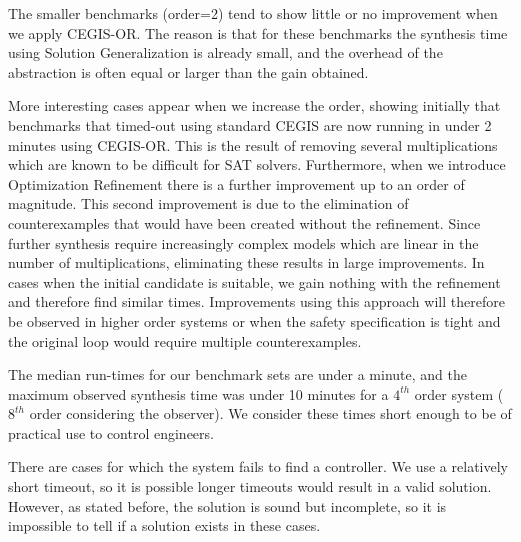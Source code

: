 \documentclass[sigconf]{llncs}
\begin{document}
The smaller benchmarks (order=2) tend to show little or no improvement when we
apply CEGIS-OR.  The reason is that for these benchmarks the synthesis time using
Solution Generalization is already small, and the overhead of the abstraction is
often equal or larger than the gain obtained.

More interesting cases appear when we increase the order, showing initially that
benchmarks that timed-out using standard CEGIS are now running in under 2
minutes using CEGIS-OR. This is the result of removing several multiplications which are
known to be difficult for SAT solvers.  Furthermore, when we introduce Optimization
Refinement there is a further improvement up to an order of magnitude.  This second
improvement is due to the elimination of counterexamples that would have been
created without the refinement. Since further synthesis require increasingly
complex models which are linear in the number of multiplications, eliminating 
these results in large improvements.  In cases when the initial candidate is
suitable, we gain nothing with the refinement and therefore find similar times.
Improvements using this approach will therefore be observed in higher order
systems or when the safety specification is tight and the original loop would
require multiple counterexamples.

The median run-times for our benchmark sets are under a minute, and the
maximum observed synthesis time was under 10 minutes for a $4^{th}$ order system
($8^{th}$ order considering the observer).  We consider these times
short enough to be of practical use to control engineers.

There are cases for which the system fails to find a controller.  We use a
relatively short timeout, so it is possible longer timeouts would result in a
valid solution. However, as stated before, the solution is sound but incomplete,
so it is impossible to tell if a solution exists in these cases. 

\end{document}

